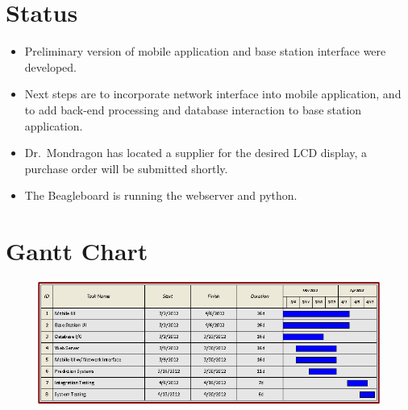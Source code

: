 \documentclass[11pt,letterpaper]{article}
\begin{document}
\section{Status}
\begin{itemize}
\item Preliminary version of mobile application and base station interface were developed. 
\item Next steps are to incorporate network interface into mobile application, and to add back-end processing and database interaction to base station application.
\item  Dr.\ Mondragon has located a supplier for the desired LCD display, a purchase order will be submitted shortly. 
\item The Beagleboard is running the webserver and python.
\end{itemize}

\section{Gantt Chart}
\begin{figure}[h!]
\begin{center}
\includegraphics[scale=.6]{GanttChartI}
\end{center}
\end{figure}
\end{document}
